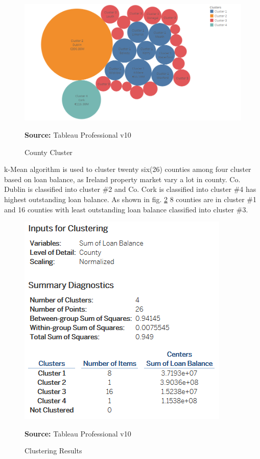 \begin{center}
\begin{figure}[!htb]
\includegraphics[scale=0.5]{clustero.png}
\centering
\caption{County Cluster}{\textbf{Source:} Tableau Professional v10}
\label{fig:clustero}
\end{figure}
\end{center}

k-Mean algorithm is used to cluster twenty six(26) counties among four cluster based on loan balance, as Ireland property market vary a lot in county. Co. Dublin is classified into cluster \#2 and Co. Cork is classified into cluster \#4 has highest outstanding loan balance. As shown in fig. \ref{fig:cluster} 8 counties are in cluster \#1 and 16 counties with least outstanding loan balance classified into cluster \#3.

\begin{center}
\begin{figure}[!htb]
\includegraphics[scale=0.5]{cluster.png}
\centering
\caption{Clustering Results}{\textbf{Source:} Tableau Professional v10}
\label{fig:cluster}
\end{figure}
\end{center}

